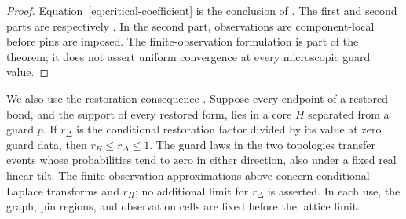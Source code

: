 \begin{proof}
Equation~\eqref{eq:critical-coefficient} is the conclusion of
\cite[Section~6]{C}.  The first and second parts are respectively
\cite[Theorems~3.1 and~3.2]{C}.  In the second part, observations are
component-local before pins are imposed.  The finite-observation
formulation is part of the theorem; it does not assert uniform
convergence at every microscopic guard value.
\end{proof}

We also use the restoration consequence \cite[Lemma~3.9]{C}.
Suppose every endpoint of a restored bond, and the support of every
restored form, lies in a core \(H\) separated from a guard \(p\).
If \(r_\Delta\) is the conditional restoration factor divided by
its value at zero guard data, then \(r_H\le r_\Delta\le1\).
The guard laws in the two topologies transfer events whose
probabilities tend to zero in either direction, also under a fixed
real linear tilt.  The finite-observation approximations above concern
conditional Laplace transforms and \(r_H\); no additional limit for
\(r_\Delta\) is asserted.  In each use, the graph, pin regions, and
observation cells are fixed before the lattice limit.
